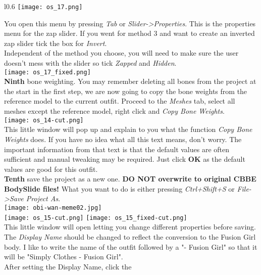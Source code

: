 \begin{wrapfigure}[11]{l}{0.6\textwidth}
    \vspace{8pt}
    \texttt{[image: os\_17.png]}
\end{wrapfigure}
You open this menu by pressing \textit{Tab} or \textit{Slider->Properties}. This is the properties menu for the zap slider.
If you went for method 3 and want to create an inverted zap slider tick the box for \textit{Invert}.\\
Independent of the method you choose, you will need to make sure the user doesn't mess with the slider so tick \textit{Zapped}
and \textit{Hidden}.\\
\texttt{[image: os\_17\_fixed.png]}\\
\textbf{Ninth} bone weighting. You may remember deleting all bones from the project at the start in the first step, we are now going 
to copy the bone weights from the reference model to the current outfit. Proceed to the \textit{Meshes} tab, select all meshes except
the reference model, right click and \textit{Copy Bone Weights}.\\
\texttt{[image: os\_14-cut.png]}\\
This little window will pop up and explain to you what the function \textit{Copy Bone Weights} does. If you have no idea what all 
this text means, don't worry. The important information from that text is that the default values are often sufficient 
and manual tweaking may be required. Just click \textbf{OK} as the default values are good for this outfit.\\
\textbf{Tenth} save the project as a new one. \textbf{DO NOT overwrite to original CBBE BodySlide files!} What you want to do is 
either pressing \textit{Ctrl+Shift+S} or \textit{File->Save Project As}.\\
\texttt{[image: obi-wan-meme02.jpg]}\\
\texttt{[image: os\_15-cut.png]}
\texttt{[image: os\_15\_fixed-cut.png]}\\
This little window will open letting you change different properties before saving.\\
The \textit{Display Name} should be changed to reflect the conversion to the Fusion Girl body. I like to write the name of the 
outfit followed by a "- Fusion Girl" so that it will be "Simply Clothes - Fusion Girl".\\ After setting the Display Name, click the 
